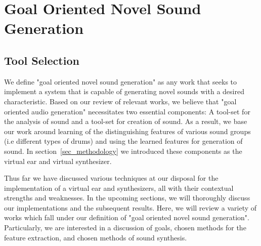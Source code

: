 \documentclass[\main/thesis.tex]{subfiles}
\begin{document}

% 
\section{Goal Oriented Novel Sound Generation}

\label{related}
\subsection{Tool Selection}
We define "goal oriented novel sound generation" as any work that seeks to implement a system that is capable of generating novel sounds with a desired characteristic. Based on our review of relevant works, we believe that "goal oriented audio generation" necessitates two essential components: A tool-set for the analysis of sound and a tool-set for creation of sound. As a result, we base our work around learning of the distinguishing features of various sound groups (i.e different types of drums) and using the learned features for generation of sound. In section~\ref{sec_methodology} we introduced these components as the virtual ear and virtual synthesizer. 

 Thus far we have discussed various techniques at our disposal for the implementation of a virtual ear and synthesizers, all with their contextual strengths and weaknesses. In the upcoming sections, we will thoroughly discuss our implementations and the subsequent results. Here, we will review a variety of works which fall under our definition of "goal oriented novel sound generation". Particularly, we are interested in a discussion of goals, chosen methods for the feature extraction, and chosen methods of sound synthesis. 
\end{document}
